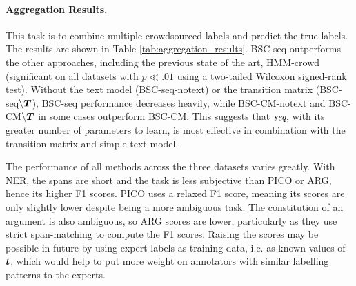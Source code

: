 \paragraph{Aggregation Results. }\label{sec:task1}

This task is to combine multiple crowdsourced labels and predict the true labels.
The results are shown in Table \ref{tab:aggregation_results}.
BSC-seq outperforms the other approaches,
including the previous state of the art, HMM-crowd (significant on all datasets
 with $p\ll.01$ using a two-tailed Wilcoxon signed-rank test).
Without the text model (BSC-seq-notext) or the transition matrix (BSC-seq$\backslash\boldsymbol T$),
BSC-seq performance decreases heavily,
while BSC-CM-notext and BSC-CM$\backslash\boldsymbol T$ in some cases outperform
BSC-CM.
This suggests that $\emph{seq}$, with its greater number of parameters to learn, 
is most effective in combination with the transition matrix and simple text model.

The performance of all methods across the three datasets varies greatly.
With NER, the spans are short and the task is less subjective than PICO or ARG,
hence its higher F1 scores. PICO uses a relaxed F1 score, meaning its scores are
only slightly lower despite being a more ambiguous task. The constitution of an 
argument is also ambiguous, so ARG scores are lower, particularly as they use  
strict span-matching to compute the F1 scores. Raising the scores may be possible in future
by using expert labels as training data, i.e. as known values of $\boldsymbol t$,
which would help to put more weight on annotators with similar labelling 
patterns to the experts.

